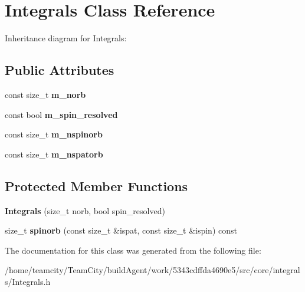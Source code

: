\hypertarget{classIntegrals}{}\section{Integrals Class Reference}
\label{classIntegrals}


Inheritance diagram for Integrals\+:
\subsection*{Public Attributes}
\begin{DoxyCompactItemize}
\item 
const size\+\_\+t {\bfseries m\+\_\+norb}\hypertarget{classIntegrals_a58fcfb338da894a36056842ab6bc8f5c}{}\label{classIntegrals_a58fcfb338da894a36056842ab6bc8f5c}

\item 
const bool {\bfseries m\+\_\+spin\+\_\+resolved}\hypertarget{classIntegrals_ad51ca862d06c5bd6279a2c658e6a0ea5}{}\label{classIntegrals_ad51ca862d06c5bd6279a2c658e6a0ea5}

\item 
const size\+\_\+t {\bfseries m\+\_\+nspinorb}\hypertarget{classIntegrals_a22ad03b1d5386dba7c1426f285cdd081}{}\label{classIntegrals_a22ad03b1d5386dba7c1426f285cdd081}

\item 
const size\+\_\+t {\bfseries m\+\_\+nspatorb}\hypertarget{classIntegrals_a5020b18ab8bdfede8b78c511025b5000}{}\label{classIntegrals_a5020b18ab8bdfede8b78c511025b5000}

\end{DoxyCompactItemize}
\subsection*{Protected Member Functions}
\begin{DoxyCompactItemize}
\item 
{\bfseries Integrals} (size\+\_\+t norb, bool spin\+\_\+resolved)\hypertarget{classIntegrals_a0b446807fda4d429a289a064aa7948fe}{}\label{classIntegrals_a0b446807fda4d429a289a064aa7948fe}

\item 
size\+\_\+t {\bfseries spinorb} (const size\+\_\+t \&ispat, const size\+\_\+t \&ispin) const \hypertarget{classIntegrals_aa5c24ad66ebd1b881b3b20dfc37d4323}{}\label{classIntegrals_aa5c24ad66ebd1b881b3b20dfc37d4323}

\end{DoxyCompactItemize}


The documentation for this class was generated from the following file\+:\begin{DoxyCompactItemize}
\item 
/home/teamcity/\+Team\+City/build\+Agent/work/5343cdffda4690e5/src/core/integrals/Integrals.\+h\end{DoxyCompactItemize}

